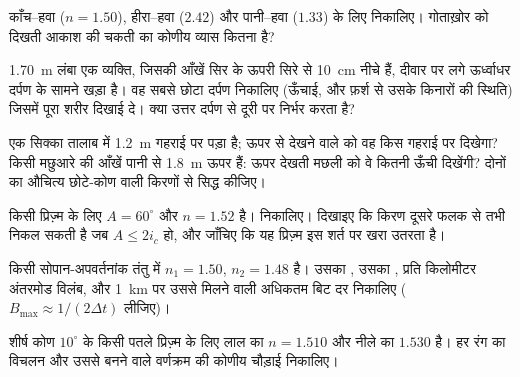 \begin{exercise}[$\star$]\label{exo:b1:rays-reflection-refraction:3}
काँच--हवा ($n = 1.50$), हीरा--हवा ($2.42$) और पानी--हवा ($1.33$) के लिए
 निकालिए। गोताख़ोर को दिखती आकाश की चकती का कोणीय व्यास कितना है?
\end{exercise}

\begin{exercise}[$\star$]\label{exo:b1:rays-reflection-refraction:4}
\qty{1.70}{m} लंबा एक व्यक्ति, जिसकी आँखें सिर के ऊपरी सिरे से \qty{10}{cm}
नीचे हैं, दीवार पर लगे ऊर्ध्वाधर दर्पण के सामने खड़ा है। वह सबसे छोटा दर्पण
निकालिए (ऊँचाई, और फ़र्श से उसके किनारों की स्थिति) जिसमें पूरा शरीर दिखाई दे।
क्या उत्तर दर्पण से दूरी पर निर्भर करता है?
\end{exercise}

\begin{exercise}[$\star\star$]\label{exo:b1:rays-reflection-refraction:5}
एक सिक्का तालाब में \qty{1.2}{m} गहराई पर पड़ा है; ऊपर से देखने वाले को वह
किस गहराई पर दिखेगा? किसी मछुआरे की आँखें पानी से \qty{1.8}{m} ऊपर हैं: ऊपर
देखती मछली को वे कितनी ऊँची दिखेंगी? दोनों का औचित्य छोटे-कोण वाली किरणों से
सिद्ध कीजिए।
\end{exercise}

\begin{exercise}[$\star\star$]\label{exo:b1:rays-reflection-refraction:6}
किसी प्रिज़्म के लिए $A = 60^\circ$ और $n = 1.52$ है। 
निकालिए। दिखाइए कि किरण दूसरे फलक से तभी निकल सकती है जब
$A \leq 2 i_c$ हो, और जाँचिए कि यह प्रिज़्म इस शर्त पर खरा उतरता है।
\end{exercise}

\begin{exercise}[$\star\star$]\label{exo:b1:rays-reflection-refraction:7}
किसी सोपान-अपवर्तनांक तंतु में $n_1 = 1.50$, $n_2 = 1.48$ है। उसका
, उसका , प्रति किलोमीटर अंतरमोड विलंब, और
\qty{1}{km} पर उससे मिलने वाली अधिकतम बिट दर निकालिए
($B_{\max} \approx 1/(2\Delta t)$ लीजिए)।
\end{exercise}

\begin{exercise}[$\star\star$]\label{exo:b1:rays-reflection-refraction:8}
शीर्ष कोण $10^\circ$ के किसी पतले प्रिज़्म के लिए लाल का $n = 1.510$ और नीले
का $1.530$ है। हर रंग का विचलन और उससे बनने वाले वर्णक्रम की कोणीय चौड़ाई
निकालिए।
\end{exercise}

